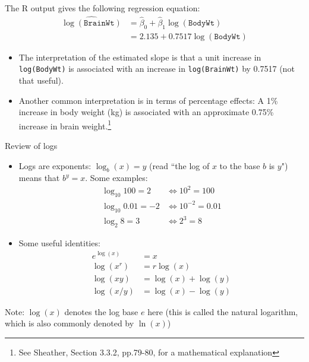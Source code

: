 \documentclass[10pt]{beamer}
\begin{document}
\begin{frame}
The R output gives the following regression equation:
\begin{align*}
\widehat{\log(\texttt{BrainWt})} &= \hat{\beta}_0 + \hat{\beta}_1 \log(\texttt{BodyWt})\\
& = 2.135 + 0.7517 \log(\texttt{BodyWt})
\end{align*}
\vspace{2.5pt}

\begin{itemize}
\item The interpretation of the estimated slope is that a unit increase in \texttt{log(BodyWt)} is associated with an increase in \texttt{log(BrainWt)} by 0.7517 (not that useful).  
\vspace{5pt}
\item Another common interpretation is in terms of percentage effects: A 1\% increase in body weight (kg) is associated with an approximate 0.75\% increase in brain weight.\footnote{See Sheather, Section 3.3.2, pp.79-80, for a mathematical explanation}
\end{itemize}
\end{frame}

\begin{frame}{Review of logs}
\begin{itemize}
\item Logs are exponents: $\log_b(x) = y$ (read ``the log of $x$ to the base $b$ is $y$") means that $b^y = x$.  Some examples:
\begin{align*}
\log_{10} 100 = 2 &\Longleftrightarrow 10^2 = 100\\
\log_{10} 0.01 = -2 &\Longleftrightarrow 10^{-2} = 0.01\\
\log_{2} 8 = 3 &\Longleftrightarrow 2^3 = 8
\end{align*}
\item Some useful identities:
\begin{align*}
e^{\log(x)} &= x\\
\log(x^r) &= r \log(x)\\
\log(xy) &= \log(x) + \log(y)\\
\log(x/y) &= \log(x) - \log(y)
\end{align*}
\end{itemize}
Note: $\log(x)$ denotes the log base $e$ here (this is called the natural logarithm, which is also commonly denoted by $\ln(x)$)
\end{frame}
\end{document}
